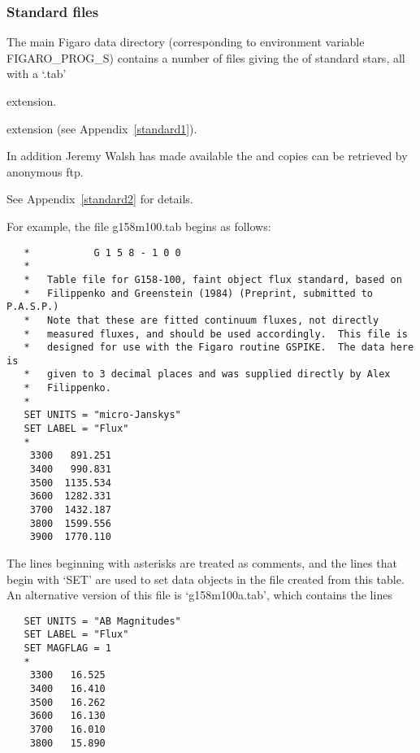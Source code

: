 
\subsubsection{\label{techno5standard}Standard files}

   The main Figaro data directory (corresponding to environment variable
   FIGARO\_PROG\_S) contains a number of files giving the
   of standard stars, all with a `.tab' 
\begin{htmlonly}
   extension.
\end{htmlonly}
\begin{latexonly}
   extension (see Appendix~\ref{standard1}).
\end{latexonly}
   In addition  Jeremy Walsh has made available the 
 and copies can be
   retrieved by anonymous ftp.  
\begin{latexonly}
See Appendix~\ref{standard2} for details.
\end{latexonly}

   For example, the file g158m100.tab begins as follows:

\begin{verbatim}
   *           G 1 5 8 - 1 0 0
   *
   *   Table file for G158-100, faint object flux standard, based on
   *   Filippenko and Greenstein (1984) (Preprint, submitted to P.A.S.P.)
   *   Note that these are fitted continuum fluxes, not directly
   *   measured fluxes, and should be used accordingly.  This file is
   *   designed for use with the Figaro routine GSPIKE.  The data here is
   *   given to 3 decimal places and was supplied directly by Alex
   *   Filippenko.
   *
   SET UNITS = "micro-Janskys"
   SET LABEL = "Flux"
   *
    3300   891.251
    3400   990.831
    3500  1135.534
    3600  1282.331
    3700  1432.187
    3800  1599.556
    3900  1770.110
\end{verbatim}

   The lines beginning with asterisks are treated as comments, and the
   lines that begin with `SET' are used to set data objects in the file
   created from this table.  An alternative version of this file is
   `g158m100a.tab', which contains the lines

\begin{verbatim}
   SET UNITS = "AB Magnitudes"
   SET LABEL = "Flux"
   SET MAGFLAG = 1
   *
    3300   16.525
    3400   16.410
    3500   16.262
    3600   16.130
    3700   16.010
    3800   15.890
\end{verbatim}

